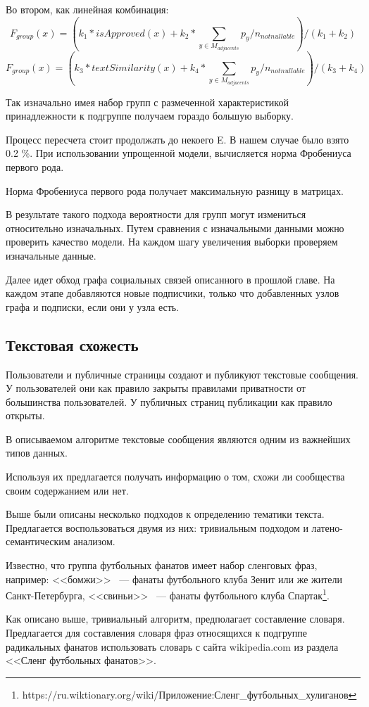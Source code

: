 \documentclass[annotation,times,page4]{itmo-student-thesis}
\begin{document}
Во втором, как линейная комбинация:
\[
    F_{group}(x) = (k_{1} * isApproved(x) + k_{2} * \sum_{y \in M_{adjacents}}p_{y}/n_{notnullable}) / (k_{1} + k_{2}) 
\] 
\[
    F_{group}(x) = (k_{3} * textSimilarity(x) + k_{4} * \sum_{y \in M_{adjacents}}p_{y}/n_{notnullable}) / (k_{3} + k_{4}) 
\] 


Так изначально имея набор групп с размеченной характеристикой принадлежности к подгруппе получаем гораздо большую выборку. 

Процесс пересчета стоит продолжать до некоего E. В нашем случае было взято 0.2 \%.
При использовании упрощенной модели, вычисляется норма Фробениуса первого рода. 
  
Норма Фробениуса первого рода получает максимальную разницу в матрицах.

В результате такого подхода вероятности для групп могут измениться относительно изначальных. Путем сравнения с изначальными данными можно проверить качество модели.
На каждом шагу увеличения выборки проверяем изначальные данные.


Далее идет обход графа социальных связей описанного в прошлой главе. На каждом этапе добавляются новые подписчики, только что добавленных узлов графа и подписки, если они у узла есть.

\subsection{Текстовая схожесть}
Пользователи и публичные страницы создают и публикуют текстовые сообщения. У пользователей они как правило закрыты правилами приватности от большинства пользователей. У публичных страниц публикации как правило открыты. 

В описываемом алгоритме текстовые сообщения являются одним из важнейших типов данных. 

Используя их предлагается получать информацию о том, схожи ли сообщества своим содержанием или нет.

Выше были описаны несколько подходов к определению тематики текста. Предлагается воспользоваться двумя из них: тривиальным подходом и латено-семантическим анализом. 

Известно, что группа футбольных фанатов имеет набор сленговых фраз, например: <<бомжи>> ~--- фанаты футбольного клуба Зенит или же жители Санкт-Петербурга, <<свиньи>> ~--- фанаты футбольного клуба Спартак\footnote{https://ru.wiktionary.org/wiki/Приложение:Сленг\_футбольных\_хулиганов}.

Как описано выше, тривиальный алгоритм, предполагает составление словаря. Предлагается для составления словаря фраз относящихся к подгруппе радикальных фанатов использовать словарь с сайта wikipedia.com из раздела <<Сленг футбольных фанатов>>.
\end{document}
